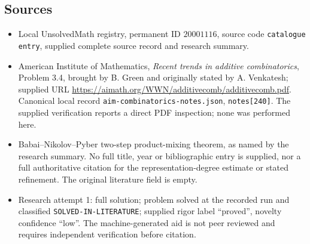 \documentclass[11pt]{article}
\begin{document}
\subsection{Sources}
\begin{itemize}
\item Local UnsolvedMath registry, permanent ID $20001116$, source code \texttt{catalogue entry}, supplied complete source record and research summary.
\item American Institute of Mathematics, \emph{Recent trends in additive combinatorics}, Problem 3.4, brought by B. Green and originally stated by A. Venkatesh; supplied URL \url{https://aimath.org/WWN/additivecomb/additivecomb.pdf}. Canonical local record \texttt{aim-combinatorics-notes.json}, \texttt{notes[240]}. The supplied verification reports a direct PDF inspection; none was performed here.
\item Babai--Nikolov--Pyber two-step product-mixing theorem, as named by the research summary. No full title, year or bibliographic entry is supplied, nor a full authoritative citation for the representation-degree estimate or stated refinement. The original literature field is empty.
\item Research attempt 1: full solution; problem solved at the recorded run and classified \texttt{SOLVED-IN-LITERATURE}; supplied rigor label ``proved'', novelty confidence ``low''. The machine-generated aid is not peer reviewed and requires independent verification before citation.
\end{itemize}
\end{document}
